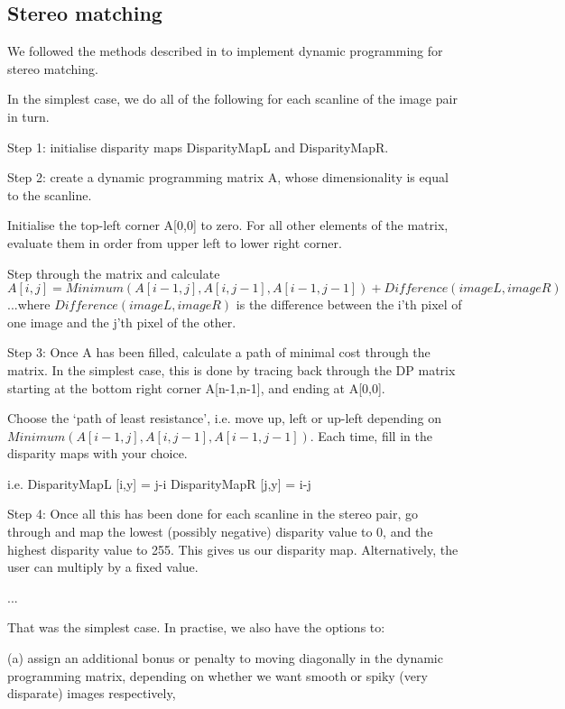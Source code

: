 
\subsection{Stereo matching}
\label{sec:stereo}

We followed the methods described in \cite{realtimestereo} to implement dynamic programming for stereo matching.

In the simplest case, we do all of the following for each scanline of the image pair in turn.

Step 1: initialise disparity maps DisparityMapL and DisparityMapR.

Step 2: create a dynamic programming matrix A, whose dimensionality is equal to the scanline.

Initialise the top-left corner A[0,0] to zero. For all other elements of the matrix, evaluate them in order from upper left to lower right corner.

Step through the matrix and calculate
\[
A[i,j] = Minimum(A[i-1,j], A[i,j-1], A[i-1,j-1])  +  Difference(imageL, imageR)
\]
...where $Difference(imageL, imageR)$ is the difference between the i'th pixel of one image and the j'th pixel of the other.

Step 3: Once A has been filled, calculate a path of minimal cost through the matrix. In the simplest case, this is done by tracing back through the DP matrix starting at the bottom right corner A[n-1,n-1], and ending at A[0,0].

Choose the `path of least resistance', i.e. move up, left or up-left depending on $Minimum(A[i-1,j], A[i,j-1], A[i-1,j-1])$. Each time, fill in the disparity maps with your choice.

i.e.
DisparityMapL [i,y] = j-i
DisparityMapR [j,y] = i-j

Step 4: Once all this has been done for each scanline in the stereo pair, go through and map the lowest (possibly negative) disparity value to 0, and the highest disparity value to 255. This gives us our disparity map. Alternatively, the user can multiply by a fixed value.

...

That was the simplest case. In practise, we also have the options to:

(a) assign an additional bonus or penalty to moving diagonally in the dynamic programming matrix, depending on whether we want smooth or spiky (very disparate) images respectively,

